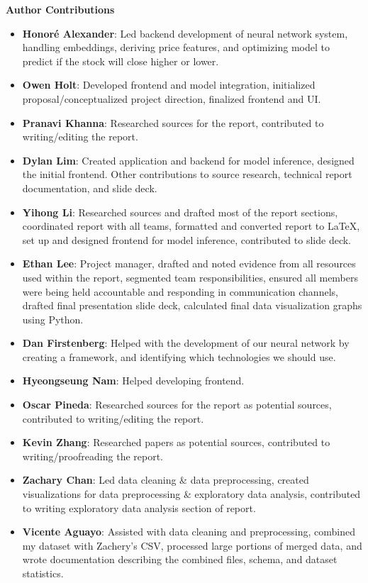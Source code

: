 \documentclass[letterpaper,12pt, twocolumn]{report}
\begin{document}
\newpage\newpage\newpage
\vspace{20pt}
\large
\noindent
\textbf{Author Contributions} 
\normalsize
\begin{itemize}
    \item \textbf{Honoré Alexander}: Led backend development of neural network system, handling embeddings, deriving price features, and optimizing model to predict if the stock will close higher or lower.
    \item \textbf{Owen Holt}:  Developed frontend and model integration, initialized proposal/conceptualized project direction, finalized frontend and UI.
    \item \textbf{Pranavi Khanna}: Researched sources for the report, contributed to writing/editing the report. 
    \item \textbf{Dylan Lim}: Created application and backend for model inference, designed the initial frontend. Other contributions to source research, technical report documentation, and slide deck.
    \item \textbf{Yihong Li}: Researched sources and drafted most of the report sections, coordinated report with all teams, formatted and converted report to LaTeX, set up and designed frontend for model inference, contributed to slide deck.
    \item \textbf{Ethan Lee}: Project manager, drafted and noted evidence from all resources used within the report, segmented team responsibilities, ensured all members were being held accountable and responding in communication channels, drafted final presentation slide deck, calculated final data visualization graphs using Python.
    \item \textbf{Dan Firstenberg}: Helped with the development of our neural network by creating a framework, and identifying which technologies we should use.
    \item \textbf{Hyeongseung Nam}: Helped developing frontend.
    \item \textbf{Oscar Pineda}: Researched sources for the report as potential sources, contributed to writing/editing the report.
    \item \textbf{Kevin Zhang}: Researched papers as potential sources, contributed to writing/proofreading the report.
    \item \textbf{Zachary Chan}:  Led data cleaning \& data preprocessing, created visualizations for data preprocessing \& exploratory data analysis, contributed to writing exploratory data analysis section of report.
    \item \textbf{Vicente Aguayo}: Assisted with data cleaning and preprocessing,  combined my dataset with Zachery’s CSV, processed large portions of merged data, and wrote documentation describing the combined files, schema, and dataset statistics. 

\end{itemize}
\end{document}
